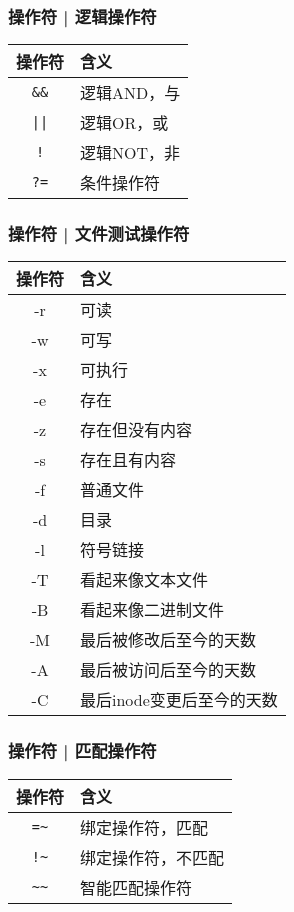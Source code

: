 \begin{frame}
  \frametitle{操作符 | \alert{逻辑操作符}}
  \begin{table}
    \centering
    \begin{tabularx}{0.5\textwidth}{cX}
      \hline
      \rowcolor{blue!50}操作符 & 含义\\
      \hline
      \verb|&&| & 逻辑AND，与\\
      \verb=||= & 逻辑OR，或\\
      \verb|!| & 逻辑NOT，非\\
      \verb|?=| & 条件操作符\\
      \hline
    \end{tabularx}
  \end{table}
\end{frame}

\begin{frame}
  \frametitle{操作符 | 文件测试操作符}
  \begin{table}
    \centering
    \begin{tabularx}{0.7\textwidth}{cX}
      \hline
      \rowcolor{blue!50}操作符 & 含义\\
      \hline
      -r & 可读\\
      -w & 可写\\
      -x & 可执行\\
      -e & 存在\\
      -z & 存在但没有内容\\
      -s & 存在且有内容\\
      -f & 普通文件\\
      -d & 目录\\
      -l & 符号链接\\
      -T & 看起来像文本文件\\
      -B & 看起来像二进制文件\\
      -M & 最后被修改后至今的天数\\
      -A & 最后被访问后至今的天数\\
      -C & 最后inode变更后至今的天数\\
      \hline
    \end{tabularx}
  \end{table}
\end{frame}

\begin{frame}[fragile]
  \frametitle{操作符 | \alert{匹配操作符}}
  \begin{table}
    \centering
    \begin{tabularx}{0.5\textwidth}{cX}
      \hline
      \rowcolor{blue!50}操作符 & 含义\\
      \hline
      \verb|=~| & 绑定操作符，匹配\\
      \verb|!~| & 绑定操作符，不匹配\\
      \verb|~~| & 智能匹配操作符\\
      \hline
    \end{tabularx}
  \end{table}
\end{frame}

